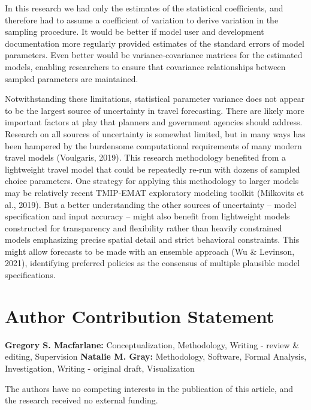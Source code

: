 \documentclass[
  letterpaper,
  number,
  review,
  3p]{elsarticle}
\begin{document}
In this research we had only the estimates of the statistical
coefficients, and therefore had to assume a coefficient of variation to
derive variation in the sampling procedure. It would be better if model
user and development documentation more regularly provided estimates of
the standard errors of model parameters. Even better would be
variance-covariance matrices for the estimated models, enabling
researchers to ensure that covariance relationships between sampled
parameters are maintained.

Notwithstanding these limitations, statistical parameter variance does
not appear to be the largest source of uncertainty in travel
forecasting. There are likely more important factors at play that
planners and government agencies should address. Research on all sources
of uncertainty is somewhat limited, but in many ways has been hampered
by the burdensome computational requirements of many modern travel
models (Voulgaris, 2019). This research methodology benefited from a
lightweight travel model that could be repeatedly re-run with dozens of
sampled choice parameters. One strategy for applying this methodology to
larger models may be relatively recent TMIP-EMAT exploratory modeling
toolkit (Milkovits et al., 2019). But a better understanding the other
sources of uncertainty -- model specification and input accuracy --
might also benefit from lightweight models constructed for transparency
and flexibility rather than heavily constrained models emphasizing
precise spatial detail and strict behavioral constraints. This might
allow forecasts to be made with an ensemble approach (Wu \& Levinson,
2021), identifying preferred policies as the consensus of multiple
plausible model specifications.


\section*{Author Contribution
Statement}\label{author-contribution-statement}


\textbf{Gregory S. Macfarlane:} Conceptualization, Methodology, Writing
- review \& editing, Supervision \textbf{Natalie M. Gray:} Methodology,
Software, Formal Analysis, Investigation, Writing - original draft,
Visualization

The authors have no competing interests in the publication of this
article, and the research received no external funding.
\end{document}
